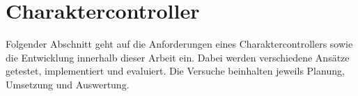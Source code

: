 \chapter{Charaktercontroller}
\label{sec:charaktercontroller}
Folgender Abschnitt geht auf die Anforderungen eines Charaktercontrollers sowie die Entwicklung innerhalb dieser Arbeit ein. Dabei werden verschiedene Ansätze getestet, implementiert und evaluiert. Die Versuche beinhalten jeweils Planung, Umsetzung und Auswertung.




